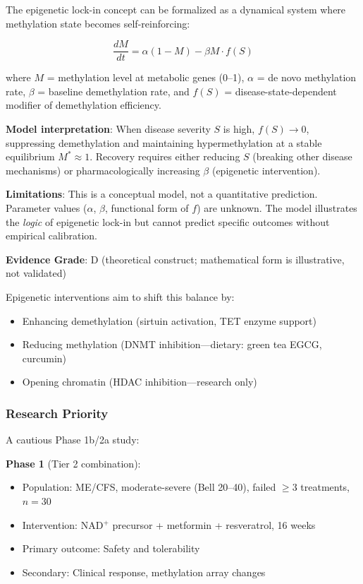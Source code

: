 \begin{hypothesis}
The epigenetic lock-in concept can be formalized as a dynamical system where methylation state becomes self-reinforcing:

\[
\frac{dM}{dt} = \alpha(1 - M) - \beta M \cdot f(S)
\]

where $M$ = methylation level at metabolic genes (0--1), $\alpha$ = de novo methylation rate, $\beta$ = baseline demethylation rate, and $f(S)$ = disease-state-dependent modifier of demethylation efficiency.

\textbf{Model interpretation}: When disease severity $S$ is high, $f(S) \to 0$, suppressing demethylation and maintaining hypermethylation at a stable equilibrium $M^* \approx 1$. Recovery requires either reducing $S$ (breaking other disease mechanisms) or pharmacologically increasing $\beta$ (epigenetic intervention).

\textbf{Limitations}: This is a conceptual model, not a quantitative prediction. Parameter values ($\alpha$, $\beta$, functional form of $f$) are unknown. The model illustrates the \textit{logic} of epigenetic lock-in but cannot predict specific outcomes without empirical calibration.

\textbf{Evidence Grade}: D (theoretical construct; mathematical form is illustrative, not validated)
\end{hypothesis}

Epigenetic interventions aim to shift this balance by:
\begin{itemize}
    \item Enhancing demethylation (sirtuin activation, TET enzyme support)
    \item Reducing methylation (DNMT inhibition---dietary: green tea EGCG, curcumin)
    \item Opening chromatin (HDAC inhibition---research only)
\end{itemize}

\subsubsection{Research Priority}

A cautious Phase 1b/2a study:

\textbf{Phase 1} (Tier 2 combination):
\begin{itemize}
    \item Population: ME/CFS, moderate-severe (Bell 20--40), failed $\geq$3 treatments, $n = 30$
    \item Intervention: NAD$^+$ precursor + metformin + resveratrol, 16 weeks
    \item Primary outcome: Safety and tolerability
    \item Secondary: Clinical response, methylation array changes
\end{itemize}

